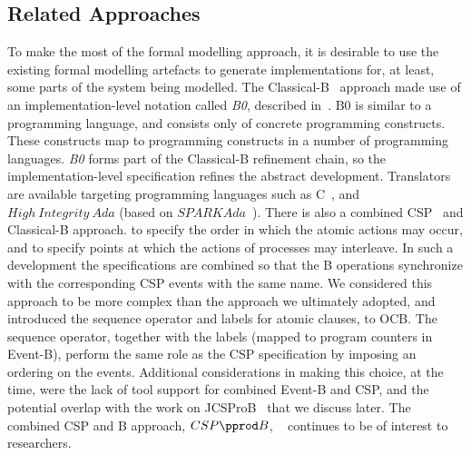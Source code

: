 \subsection{Related Approaches}
To make the most of the formal modelling approach, it is desirable to use the existing formal modelling artefacts to generate implementations for, at least, some parts of the system being modelled. The Classical-B~\cite{TheBBook} approach made use of an implementation-level notation called \emph{B0}, described in~\cite{B0RefMan}. B0 is similar to a programming language, and consists only of concrete programming constructs. These constructs map to programming constructs in a number of programming languages. \emph{B0} forms part of the Classical-B refinement chain, so the implementation-level specification refines the abstract development. Translators are available targeting programming languages such as C~\cite{KernighanR88}, and $High~ Integrity~ Ada$ (based on $SPARKAda$~\cite{SPARKAda}). 
There is also a combined CSP~\cite{} and Classical-B approach.  to specify the order in which the atomic actions may occur, and to specify points at which the actions of processes may interleave. In such a development the specifications are combined so that the B operations synchronize with the corresponding CSP events with the same name. We considered this approach to be more complex than the approach we ultimately adopted, and introduced the sequence operator and labels for atomic clauses, to OCB. The sequence operator, together with the labels (mapped to program counters in Event-B), perform the same role as the CSP specification by imposing an ordering on the events. Additional considerations in making this choice, at the time, were the lack of tool support for combined Event-B and CSP, and the potential overlap with the work on JCSProB~\cite{YangPop2007} that we discuss later.  The combined CSP and B approach, $CSP\pprod B$, ~\cite{SchneiderT02, SchneiderT05} continues to be of interest to researchers. 

